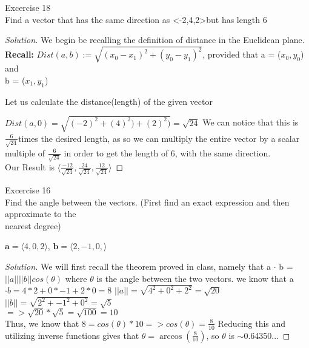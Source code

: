 \documentclass[12pt]{article}
\newenvironment{statement}[2][Section]{\begin{trivlist}
\item[\hskip \labelsep {\bfseries #1}\hskip \labelsep {\bfseries #2.}]}{\end{trivlist}}
\newenvironment{solution}{\begin{proof}[Solution]}{\end{proof}}
\begin{document}
\thispagestyle{secondpage} %
\begin{statement}{10.2}
	Excercise 18 \\
	Find a vector that has the same direction as \textless-2,4,2\textgreater but has length 6
	
	\begin{solution}
		
		We begin be recalling the definition of distance in the Euclidean plane.\\
		
		\textbf{Recall:} $ Dist(a,b) := \sqrt{(x_0 - x_1)^2 + (y_0 - y_1)^2}$, provided that a = ($x_0, y_0$) and\\
		b = ($x_1,y_1$)
		
		Let us calculate the distance(length) of the given vector
		
    $ Dist(a,0) = \sqrt{(-2)^2 + (4)^2) + (2)^2)} = \sqrt{24} $
		We can notice that this is \\
		$\frac{6}{\sqrt{24}} $times the desired length, as so we can multiply the entire vector by a scalar\\
		multiple of $\frac{6}{\sqrt{24}} $
		in order to get the length of 6, with the same direction.\\
    Our Result is   $\langle \frac{-12}{\sqrt{24}}, \frac{24}{\sqrt{24}}, \frac{12}{\sqrt{24}} \rangle$
		
		
	\end{solution}
	
	
	
	
	
\end{statement}

\begin{statement}{10.3}
	Excercise 16\\
	Find the angle between the vectors. (First find an exact expression and then approximate to the\\
	nearest degree)
	
	$\textbf{a} = \langle 4,0,2 \rangle$,   $ \textbf{b} = \langle 2,-1,0,\rangle$
	\begin{solution}
		We will first recall the theorem proved in class, namely that
		a $\cdot$ b = $||a|| ||b|| cos(\theta)$ where $\theta$ is the angle between the two vectors.
		we know that a $\cdot b = 4*2 + 0*-1 + 2*0 = 8$
		$||a|| = \sqrt{4^2 + 0^2 + 2^2} = \sqrt{20}$\\
		$||b|| = \sqrt{2^2 + -1^2 + 0^2} = \sqrt{5}$\\
		$ => \sqrt{20} * \sqrt{5} = \sqrt{100} = 10 $\\
		
		Thus, we know that $ 8 = cos(\theta) * 10 => cos(\theta) = \frac{8}{10} $ Reducing this and utilizing
		inverse functions gives that $\theta = \arccos(\frac{8}{10})$, so 
		$\theta$ is $\sim$0.64350...
		\newpage
		
		
		
		
	\end{solution}
\end{statement}
\end{document}
